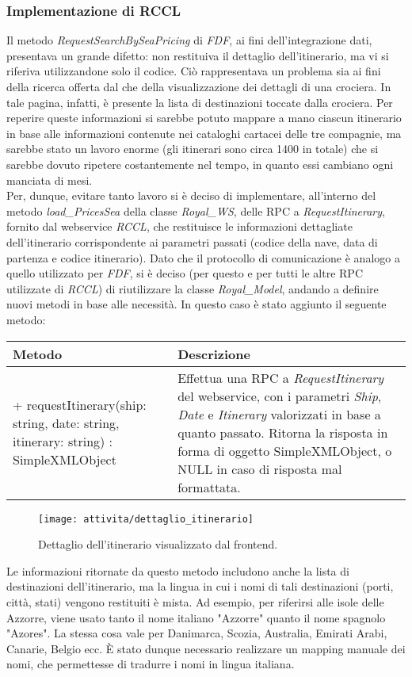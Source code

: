 \subsubsection{Implementazione di RCCL}
Il metodo \textit{RequestSearchBySeaPricing} di \textit{FDF}, ai fini dell'integrazione dati, presentava un grande difetto: non restituiva il dettaglio dell'itinerario, ma vi si riferiva utilizzandone solo il codice. Ciò rappresentava un problema sia ai fini della ricerca offerta dal \bookingEngine che della visualizzazione dei dettagli di una crociera. In tale pagina, infatti, è presente la lista di destinazioni toccate dalla crociera. Per reperire queste informazioni si sarebbe potuto mappare a mano ciascun itinerario in base alle informazioni contenute nei cataloghi cartacei delle tre compagnie, ma sarebbe stato un lavoro enorme (gli itinerari sono circa 1400 in totale) che si sarebbe dovuto ripetere costantemente nel tempo, in quanto essi cambiano ogni manciata di mesi.\\
Per, dunque, evitare tanto lavoro si è deciso di implementare, all'interno del metodo \textit{load\_PricesSea} della classe \textit{Royal\_WS}, delle \gls{RPC} a \textit{RequestItinerary}, fornito dal \gls{webservice} \textit{RCCL}, che restituisce le informazioni dettagliate dell'itinerario corrispondente ai parametri passati (codice della nave, data di partenza e codice itinerario).  Dato che il protocollo di comunicazione è analogo a quello utilizzato per \textit{FDF}, si è deciso (per questo e per tutti le altre \gls{RPC} utilizzate di \textit{RCCL}) di riutilizzare la classe \textit{Royal\_Model}, andando a definire nuovi metodi in base alle necessità. In questo caso è stato aggiunto il seguente metodo: 
\begin{center}
	\def\arraystretch{1.5}
	\begin{longtable}{ >{\raggedright}p{5.5cm} p{6.8cm}} 
		\hline
		\textbf{Metodo} & \textbf{Descrizione} \\
		\hline
		+ requestItinerary(ship: string, date: string, itinerary: string) : SimpleXMLObject & Effettua una \gls{RPC} a \textit{RequestItinerary} del \gls{webservice}, con i parametri \textit{Ship}, \textit{Date} e \textit{Itinerary} valorizzati in base a quanto passato. Ritorna la risposta in forma di oggetto SimpleXMLObject, o NULL in caso di risposta mal formattata.\\
		\hline
	\end{longtable}
\end{center}
\begin{figure}[!h] 
	\centering 
	\texttt{[image: attivita/dettaglio\_itinerario]} 
	\caption{Dettaglio dell'itinerario visualizzato dal frontend.}
\end{figure}
Le informazioni ritornate da questo metodo includono anche la lista di destinazioni dell'itinerario, ma la lingua in cui i nomi di tali destinazioni (porti, città, stati) vengono restituiti è mista. Ad esempio, per riferirsi alle isole delle Azzorre, viene usato tanto il nome italiano "Azzorre" quanto il nome spagnolo "Azores". La stessa cosa vale per Danimarca, Scozia, Australia, Emirati Arabi, Canarie, Belgio ecc. È stato dunque necessario realizzare un mapping manuale dei nomi, che permettesse di tradurre i nomi in lingua italiana.
